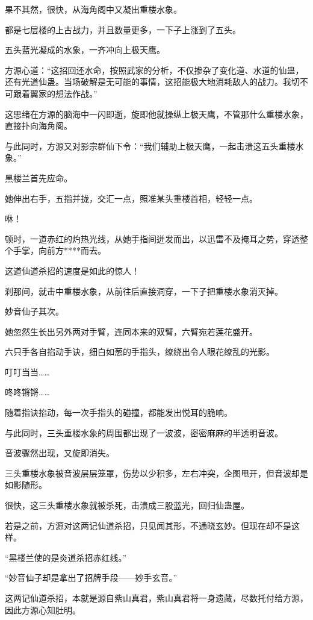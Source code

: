 \begin{this_body}
果不其然，很快，从海角阁中又凝出重楼水象。

都是七层楼的上古战力，并且数量更多，一下子上涨到了五头。

五头蓝光凝成的水象，一齐冲向上极天鹰。

方源心道：“这招回还水命，按照武家的分析，不仅掺杂了变化道、水道的仙蛊，还有光道仙蛊。当场破解是无可能的事情，这招能极大地消耗敌人的战力。我切不可跟着翼家的想法作战。”

这思绪在方源的脑海中一闪即逝，旋即他就操纵上极天鹰，不管那什么重楼水象，直接扑向海角阁。

与此同时，方源又对影宗群仙下令：“我们辅助上极天鹰，一起击溃这五头重楼水象。”

黑楼兰首先应命。

她伸出右手，五指并拢，交汇一点，照准某头重楼首相，轻轻一点。

咻！

顿时，一道赤红的灼热光线，从她手指间迸发而出，以迅雷不及掩耳之势，穿透整个手掌，向前方****而去。

这道仙道杀招的速度是如此的惊人！

刹那间，就击中重楼水象，从前往后直接洞穿，一下子把重楼水象消灭掉。

妙音仙子其次。

她忽然生长出另外两对手臂，连同本来的双臂，六臂宛若莲花盛开。

六只手各自掐动手诀，细白如葱的手指头，缭绕出令人眼花缭乱的光影。

叮叮当当……

咚咚锵锵……

随着指诀掐动，每一次手指头的碰撞，都能发出悦耳的脆响。

与此同时，三头重楼水象的周围都出现了一波波，密密麻麻的半透明音波。

音波骤然出现，又旋即消失。

三头重楼水象被音波层层笼罩，伤势以少积多，左右冲突，企图甩开，但音波却是如影随形。

很快，这三头重楼水象就被杀死，击溃成三股蓝光，回归仙蛊屋。

若是之前，方源对这两记仙道杀招，只见闻其形，不通晓玄妙。但现在却不是这样。

“黑楼兰使的是炎道杀招赤红线。”

“妙音仙子却是拿出了招牌手段——妙手玄音。”

这两记仙道杀招，本就是源自紫山真君，紫山真君将一身遗藏，尽数托付给方源，因此方源心知肚明。


\end{this_body}
